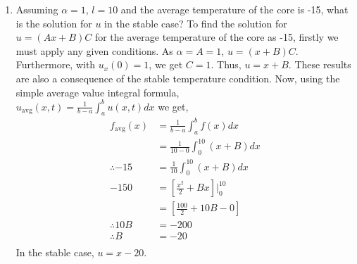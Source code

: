 \documentclass[a4paper]{article}
\newcommand{\ds}{\displaystyle}
\begin{document}
\begin{enumerate}
\begin{enumerate}
		\item Assuming $\ds{\alpha = 1}$, $\ds{l = 10}$ and the average temperature of the core is -15, what is the solution for $\ds{u}$ in the stable case?
		\bigbreak
		To find the solution for $\ds{u = (Ax+B)C}$ for the average temperature of the core as -15, firstly we must apply any given conditions. As $\ds{\alpha = A = 1}$, $\ds{u = (x+B)C}$. Furthermore, with $\ds{u_x(0) = 1}$, we get $\ds{C = 1}$. Thus, $\ds{u = x+B}$. These results are also a consequence of the stable temperature condition. Now, using the simple average value integral formula,\\ 
		$\ds{u_{\text{avg}}(x,t) = \frac{1}{b-a} \int^b_au(x,t)dx}$ we get,
		\begin{align*}
			f_{\text{avg}}(x) & = \frac{1}{b-a} \int^b_af(x)dx\\
			& = \frac{1}{10-0} \int^{10}_0(x+B)dx\\
			\therefore -15 & = \frac{1}{10} \int^{10}_0(x+B)dx\\
			-150 & = \left[\frac{x^2}{2} + Bx\right]\Bigg|^{10}_0\\
			& = \left[\frac{100}{2} + 10B - 0\right]\\
			\therefore 10B & = -200\\
			\therefore B & = -20\\
		\end{align*}
		In the stable case, $\ds{u = x-20}$.
		\bigbreak


\end{enumerate}
\end{enumerate}
\end{document}
